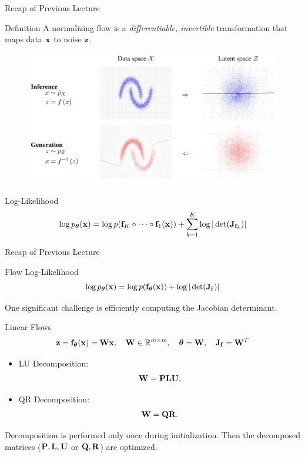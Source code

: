\documentclass{beamer}
\begin{document}
\begin{frame}{Recap of Previous Lecture}
	\begin{block}{Definition}
		A normalizing flow is a \textit{differentiable, invertible} transformation that maps data $\mathbf{x}$ to noise $\mathbf{z}$. 
	\end{block}
	\vspace{-0.1cm}
	\begin{figure}
		\includegraphics[width=0.85\linewidth]{figs/flows_how2}
	\end{figure}
	\vspace{-0.5cm}
	\begin{block}{Log-Likelihood}
		\vspace{-0.5cm}
		\[
			\log p_{\boldsymbol{\theta}}(\mathbf{x}) = \log p(\mathbf{f}_K \circ \cdots \circ \mathbf{f}_1(\mathbf{x})) + \sum_{k=1}^K\log |\det (\mathbf{J}_{\mathbf{f}_k})|
		\]
	\end{block}
\end{frame}
\begin{frame}{Recap of Previous Lecture}
	\vspace{-0.5cm}
	\begin{block}{Flow Log-Likelihood}
		\vspace{-0.3cm}
		\[
			\log p_{\boldsymbol{\theta}}(\mathbf{x}) = \log p(\mathbf{f}_{\boldsymbol{\theta}}(\mathbf{x})) + \log |\det (\mathbf{J}_{\mathbf{f}})|
		\]
		\vspace{-0.5cm}
	\end{block}
	One significant challenge is efficiently computing the Jacobian determinant.
	\begin{block}{Linear Flows}	
		\vspace{-0.2cm}
		\[
			\mathbf{z} = \mathbf{f}_{\boldsymbol{\theta}}(\mathbf{x}) = \mathbf{W} \mathbf{x}, \quad \mathbf{W} \in \mathbb{R}^{m \times m}, \quad \boldsymbol{\theta} = \mathbf{W}, \quad \mathbf{J}_{\mathbf{f}} = \mathbf{W}^T
		\]
	\end{block}
	\vspace{-0.3cm}
	\begin{itemize}
		\item LU Decomposition:
		\[
			\mathbf{W} = \mathbf{P} \mathbf{L} \mathbf{U}.
		\]
		\item QR Decomposition:
		\[
			\mathbf{W} = \mathbf{Q} \mathbf{R}.
		\]
	\end{itemize}
	Decomposition is performed only once during initialization. Then the decomposed matrices ($\mathbf{P}, \mathbf{L}, \mathbf{U}$ or $\mathbf{Q}, \mathbf{R}$) are optimized.
\end{frame}
\end{document}
